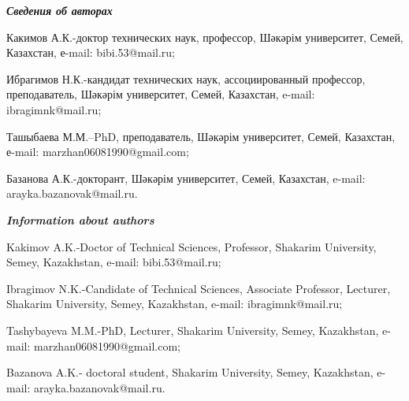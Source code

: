 \begin{info}
\hspace{1em}\emph{{\bfseries Сведения об авторах}}

Какимов А.К.-доктор технических наук, профессор, Шәкәрім университет,
Семей, Казахстан, е-mail: bibi.53@mail.ru;

Ибрагимов Н.К.-кандидат технических наук, ассоциированный профессор,
преподаватель, Шәкәрім университет, Семей, Казахстан, e-mail:
ibragimnk@mail.ru;

Ташыбаева М.М.--PhD, преподаватель, Шәкәрім университет, Семей,
Казахстан, е-mail: marzhan06081990@gmail.com;

Базанова А.К.-докторант, Шәкәрім университет, Семей, Казахстан, e-mail:
arayka.bazanovak@mail.ru.

\hspace{1em}\emph{{\bfseries Information about authors}}

Kakimov A.K.-Doctor of Technical Sciences, Professor, Shakarim
University, Semey, Kazakhstan, e-mail: bibi.53@mail.ru;

Ibragimov N.K.-Candidate of Technical Sciences, Associate Professor,
Lecturer, Shakarim University, Semey, Kazakhstan, e-mail:
ibragimnk@mail.ru;

Tashybayeva M.M.-PhD, Lecturer, Shakarim University, Semey, Kazakhstan,
e-mail: marzhan06081990@gmail.com;

Bazanova A.K.- doctoral student, Shakarim University, Semey, Kazakhstan,
e-mail: arayka.bazanovak@mail.ru.
\end{info}
